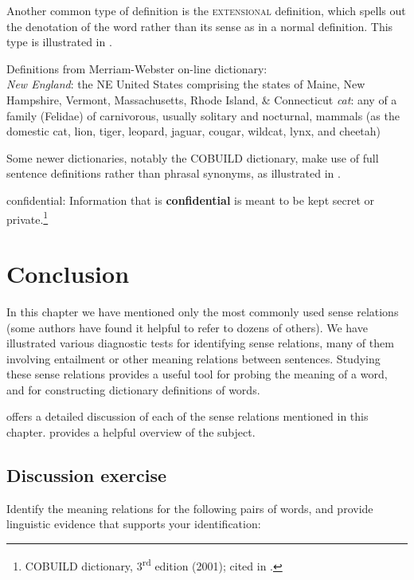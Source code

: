 Another common type of definition is the \textsc{extensional} definition, which spells out the denotation of the word rather than its sense as in a normal definition. This type is illustrated in .


\ea \label{ex:6.25}
Definitions from Merriam-Webster on-line dictionary:\\
\ea   \textit{New England}: the NE United States comprising the states of Maine, New Hampshire, Vermont, Massachusetts, Rhode Island, \& Connecticut
\ex  \textit{cat}: any of a family (Felidae) of carnivorous, usually solitary and nocturnal, mammals (as the domestic cat, lion, tiger, leopard, jaguar, cougar, wildcat, lynx, and cheetah)
\z \z

Some newer dictionaries, notably the COBUILD dictionary, make use of full sentence definitions rather than phrasal synonyms, as illustrated in .

\ea \label{ex:6.26}
confidential: Information that is \textbf{confidential} is meant to be kept secret or private.\footnote{COBUILD dictionary, 3\textsuperscript{rd} edition (2001); cited in \citet{Rundell2006}.}
\z

\section{Conclusion}\label{sec:6.4}

In this chapter we have mentioned only the most commonly used sense relations (some authors have found it helpful to refer to dozens of others). We have illustrated various diagnostic tests for identifying sense relations, many of them involving entailment or other meaning relations between sentences. Studying these sense relations provides a useful tool for probing the meaning of a word, and for constructing dictionary definitions of words.



\furtherreading



\citet[chapters 4--12]{Cruse1986} offers a detailed discussion of each of the sense relations mentioned in this chapter. \citet{Cann2011} provides a helpful overview of the subject.


\subsection*{Discussion exercise} %

Identify the meaning relations for the following pairs of words, and provide linguistic evidence that supports your identification:

